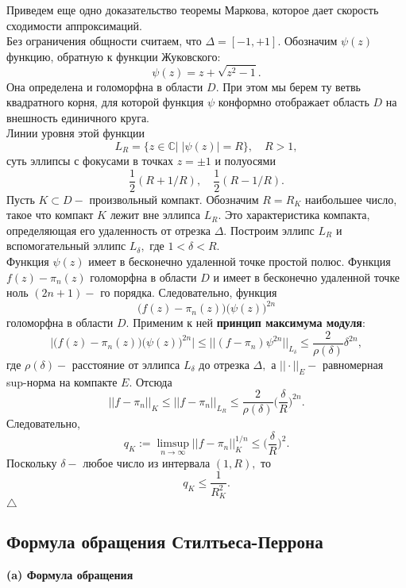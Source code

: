 \documentclass[12 pt, a4 paper]{article}
\theoremstyle{plain}   \newtheorem{Pro}{Задача}
\begin{document}
Приведем еще одно доказательство теоремы Маркова,
которое дает скорость сходимости аппроксимаций.\\
Без ограничения общности считаем, что
$ \Delta =[-1, +1] . $
Обозначим
$ \psi (z) $
функцию, обратную к функции Жуковского:
$$
  \psi (z)=z+\sqrt{z^2 -1}.
$$
Она определена и голоморфна в области
$ D .$
При этом мы берем ту ветвь квадратного корня, для которой функция
$ \psi $
конформно отображает область
$ D $
на внешность единичного круга.\\
Линии уровня этой функции
$$
  L_R =\{ z \in \mathbb{C} | \; | \psi (z) |=R \} ,
  \quad R>1,
$$
суть эллипсы с фокусами в точках
$ z= \pm 1 $
и полуосями
$$
  \frac{1}{2}(R+1/R), \quad \frac{1}{2}(R-1/R).
$$
Пусть
$ K \subset D - $
произвольный компакт. Обозначим
$ R=R_K $
наибольшее число, такое что компакт
$ K $
лежит вне эллипса
$ L_R . $
Это характеристика компакта, определяющая его удаленность от
отрезка
$ \Delta . $
Построим эллипс
$ L_R $
и вспомогательный эллипс
$ L_{\delta } , $
где
$ 1< \delta <R. $
\\
Функция
$ \psi (z ) $
имеет в бесконечно удаленной точке простой полюс.
Функция
$ f(z)-\pi _n (z) $
голоморфна в области
$ D $
и имеет в бесконечно удаленной точке ноль
$ (2n+1)- $
го порядка. Следовательно, функция
$$
  \bigl ( f(z)-\pi _n (z) \bigr )
  \bigl ( \psi (z) \bigr ) ^{2n}
$$
голоморфна в области
$ D . $
Применим к ней
{\bfseries принцип максимума модуля}:
$$
  \bigl | \bigl ( f(z)-\pi _n (z) \bigr )
  \bigl ( \psi (z) \bigr ) ^{2n} \bigr | \leq
  ||(f-\pi _n )\psi ^{2n}||_{L_{\delta}} \leq
  \frac{2}{\rho (\delta )} \delta ^{2n} ,
$$
где
$ \rho (\delta ) - $
расстояние от эллипса
$ L_{\delta} $
до отрезка
$ \Delta , $
а
$ || \cdot ||_E - $
равномерная sup-норма на компакте
$ E . $
Отсюда
$$
  ||f-\pi _n ||_K \leq ||f-\pi _n ||_{L_R}
  \leq \frac{2}{\rho (\delta )}
  \biggl ( \frac{\delta}{R} \biggr ) ^{2n}.
$$
Следовательно,
$$
  q_K := \limsup _{n \rightarrow \infty}
  ||f-\pi _n ||_K ^{1/n} \leq
  \biggl ( \frac{\delta}{R} \biggr ) ^2 .
$$
Поскольку
$ \delta - $
любое число из интервала
$ (1,R) , $
то
$$
  q_K \leq \frac{1}{R_K ^2}.
$$
$ \triangle $
\newpage
\subsection{Формула обращения Стилтьеса-Перрона}
$ \; $
\\
{\bfseries (a) Формула обращения}\\
\end{document}
